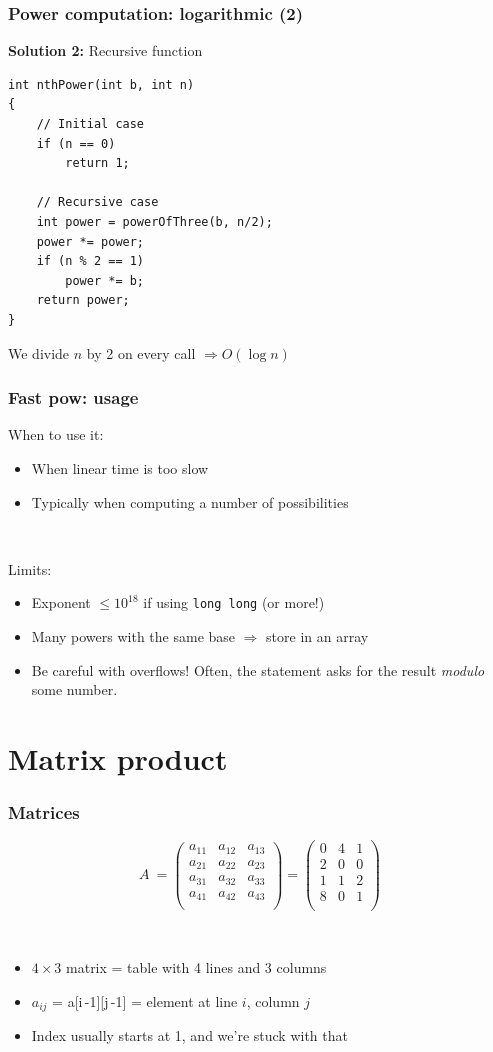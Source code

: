 \documentclass[12pt]{beamer}
\begin{document}
\begin{frame}[fragile]
\frametitle{Power computation: logarithmic (2)}
\textbf{Solution 2:} Recursive function
\begin{lstlisting}[frame=single]
int nthPower(int b, int n)
{
    // Initial case
    if (n == 0)
        return 1;
    
    // Recursive case
    int power = powerOfThree(b, n/2);
    power *= power;
    if (n % 2 == 1)
        power *= b;
    return power;
}
\end{lstlisting}
We divide $n$ by 2 on every call $\Rightarrow O(\log n)$
\end{frame}

\begin{frame}
\frametitle{Fast pow: usage}
When to use it:
\begin{itemize}
\item When linear time is too slow
\item Typically when computing a number of possibilities
\end{itemize}

~

Limits:
\begin{itemize}
\item Exponent $\leq 10^{18}$ if using \texttt{long long} (or more!)
\item Many powers with the same base $\Rightarrow$ store in an array
\item Be careful with overflows! Often, the statement asks for the result \emph{modulo} some number.
\end{itemize}
\end{frame}

\section{Matrix product}

\begin{frame}
\frametitle{Matrices}
\[
A\ =
\left(
\begin{array}{ccc}
a_{11}&a_{12}&a_{13}\\
a_{21}&a_{22}&a_{23}\\
a_{31}&a_{32}&a_{33}\\
a_{41}&a_{42}&a_{43}\\
\end{array}
\right)
=
\left(
\begin{array}{ccc}
0&4&1\\
2&0&0\\
1&1&2\\
8&0&1\\
\end{array}
\right)
\]

~

\begin{itemize}
\item $4 \times 3$ matrix = table with 4 lines and 3 columns
\item $a_{ij}$ = a[i\,-1][j\,-1] = element at line $i$, column $j$
\item Index usually starts at 1, and we're stuck with that
\end{itemize}
\end{frame}
\end{document}
